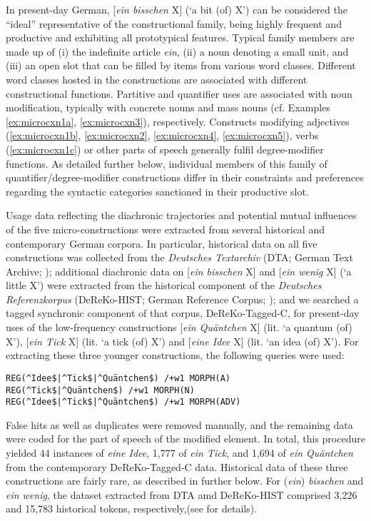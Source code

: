 \documentclass[output=paper]{langsci/langscibook}
\begin{document}
In present-day German, [\textit{ein bisschen} X] (‘a bit (of) X’) can be considered the “ideal” representative of the constructional family, being highly frequent and productive and exhibiting all prototypical features. Typical family members are made up of (i) the indefinite article \textit{ein}, (ii) a noun denoting a small unit, and (iii) an open slot that can be filled by items from various word classes. Different word classes hosted in the constructions are associated with different constructional functions. Partitive and quantifier uses are associated with noun modification, typically with concrete nouns and mass nouns (cf. Examples 
\ref{ex:microcxn1a}, \ref{ex:microcxn3}), 
respectively. Constructs modifying adjectives 
(\ref{ex:microcxn1b}, \ref{ex:microcxn2}, 
\ref{ex:microcxn4}, \ref{ex:microcxn5}), verbs 
(\ref{ex:microcxn1c}) or other parts of speech 
generally fulfil degree\hyp{}modifier functions. As 
detailed further below, individual members of this 
family of quantifier\slash degree\hyp{}modifier constructions 
differ in their constraints and preferences regarding the syntactic categories sanctioned in their 
productive slot.

Usage data reflecting the diachronic trajectories and potential mutual influences of the five micro\hyp{}constructions were extracted from several historical and contemporary German corpora. In particular, historical data on all five constructions was collected from the \textit{Deutsches Textarchiv} (DTA; German Text Archive; \citealt{Geykenlivingtextarchive2015}); additional diachronic data on [\textit{ein bisschen} X] and [\textit{ein wenig} X] (‘a little X’) were extracted from the historical component of the \textit{Deutsches Referenzkorpus} (DeReKo-HIST; German Reference Corpus; \citealt{KupietzKeibel2009}); and we searched a tagged synchronic component of that corpus, DeReKo-Tagged-C, for present-day uses of the low-frequency constructions [\textit{ein Quäntchen} X] (lit. ‘a quantum (of) X’), [\textit{ein Tick} X] (lit. ‘a tick (of) X’) and [\textit{eine Idee} X] (lit. ‘an idea (of) X’). For extracting these three younger constructions, the following queries were used:

\begin{verbatim}
REG(^Idee$|^Tick$|^Quäntchen$) /+w1 MORPH(A)
REG(^Tick$|^Quäntchen$) /+w1 MORPH(N)
REG(^Idee$|^Tick$|^Quäntchen$) /+w1 MORPH(ADV)
\end{verbatim}

False hits as well as duplicates were removed manually, and the remaining data were coded for the part of speech of the modified element. In total, this procedure yielded 44 instances of \textit{eine Idee}, 1,777 of \textit{ein Tick}, and 1,694 of \textit{ein Quäntchen} from the contemporary DeReKo-Tagged-C data. Historical data of these three constructions are fairly rare, as described in  further below. For (\textit{ein}) \textit{bisschen} and \textit{ein wenig}, the dataset extracted from DTA amd DeReKo-HIST comprised 3,226 and 15,783 historical tokens, respectively,(see \citet{NeelsReductionexpansionbit2018} for details).
\end{document}
